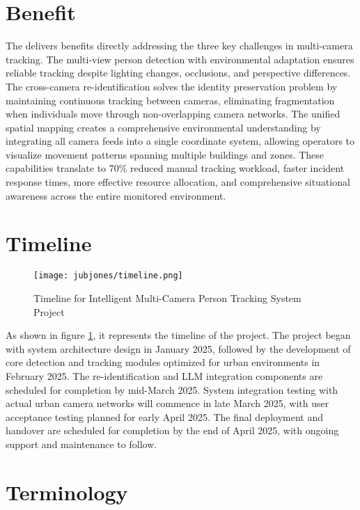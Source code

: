 \section{Benefit}
\label{section:benefit}
The \usevar{\srsTitle} delivers benefits directly addressing the three key challenges in multi-camera tracking. The multi-view person detection with environmental adaptation ensures reliable tracking despite lighting changes, occlusions, and perspective differences.
The cross-camera re-identification solves the identity preservation problem by maintaining continuous tracking between cameras, eliminating fragmentation when individuals move through non-overlapping camera networks.
The unified spatial mapping creates a comprehensive environmental understanding by integrating all camera feeds into a single coordinate system, allowing operators to visualize movement patterns spanning multiple buildings and zones.
These capabilities translate to 70\% reduced manual tracking workload, faster incident response times, more effective resource allocation, and comprehensive situational awareness across the entire monitored environment.

\section{Timeline}
\label{section:timeline}

\begin{figure}[!htb]
    \centering
    \texttt{[image: jubjones/timeline.png]}
    \caption{Timeline for Intelligent Multi-Camera Person Tracking System Project}
    \label{fig:timeline}
\end{figure}

As shown in figure \ref{fig:timeline}, it represents the timeline of the project.
The project began with system architecture design in January 2025, followed by the development of core detection
and tracking modules optimized for urban environments in February 2025. The re-identification and LLM integration components are scheduled for
completion by mid-March 2025.
System integration testing with actual urban camera networks will commence in late March 2025, with user acceptance testing planned for early April 2025.
The final deployment and handover are scheduled for completion by the end of April 2025, with ongoing support
and maintenance to follow.

\section{Terminology}
\label{section:terminology}

